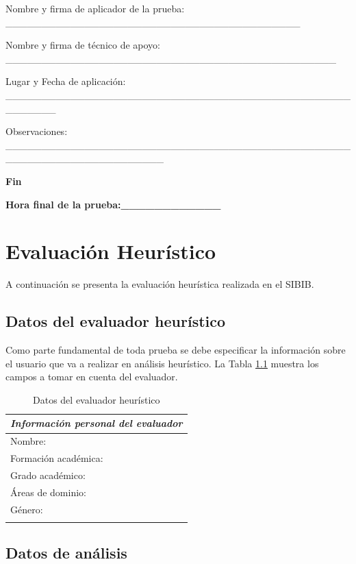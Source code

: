 Nombre y firma de aplicador de la prueba:  \_\_\_\_\_\_\_\_\_\_\_\_\_\_\_\_\_\_\_\_\_\_\_\_\_\_\_\_\_\_\_\_\_\_\_\_\_\_\_\_\_

Nombre y firma de técnico de apoyo:
 \_\_\_\_\_\_\_\_\_\_\_\_\_\_\_\_\_\_\_\_\_\_\_\_\_\_\_\_\_\_\_\_\_\_\_\_\_\_\_\_\_\_\_\_\_\_

Lugar y Fecha de aplicación:
 \_\_\_\_\_\_\_\_\_\_\_\_\_\_\_\_\_\_\_\_\_\_\_\_\_\_\_\_\_\_\_\_\_\_\_\_\_\_\_\_\_\_\_\_\_\_\_\_\_\_\_\_\_\_\_

Observaciones:
 \_\_\_\_\_\_\_\_\_\_\_\_\_\_\_\_\_\_\_\_\_\_\_\_\_\_\_\_\_\_\_\_\_\_\_\_\_\_\_\_\_\_\_\_\_\_\_\_\_\_\_\_\_\_\_\_\_\_\_\_\_\_\_\_\_\_\_\_\_\_
  
\textbf{Fin}

\textbf{Hora final de la prueba:\_\_\_\_\_\_\_\_\_\_\_\_}



\chapter{Evaluación Heurístico}\label{refanan}

A continuación se presenta la evaluación heurística realizada en el SIBIB.

\section{Datos del evaluador heurístico}

Como parte fundamental de toda prueba se debe especificar la información sobre el usuario que va a realizar en análisis heurístico. La Tabla \ref{datamin} muestra los campos a tomar en cuenta del evaluador.

\begin{longtable}{||p{4cm}|p{10cm}||}
\hline
\multicolumn{2}{||c||}{\textit{\textbf{Información personal del evaluador}}}\\ \hline 
{Nombre:}&{}\\ \hline
{Formación académica:}&{}\\ \hline
{Grado académico:}&{}\\ \hline
{Áreas de dominio:}&{}\\ \hline
{Género:}&{}\\ \hline
\caption{Datos del evaluador heurístico}\label{datamin}
\end{longtable}


\section{Datos de análisis}

